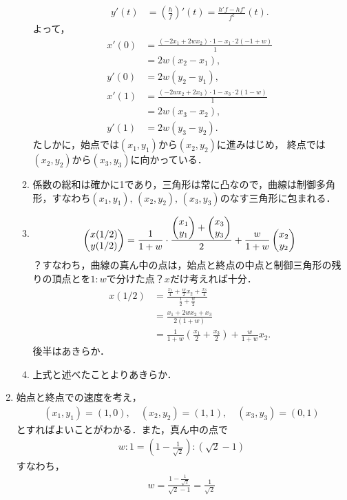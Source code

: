 \documentclass[9pt]{ltjsarticle}
\theoremstyle{break}
\theoremstyle{break}
\theoremstyle{break}
\theoremstyle{break}
\theoremstyle{break}
\theoremstyle{break}
\theoremstyle{break}
\theoremstyle{break}
\theoremstyle{break}
\theoremstyle{break}
\theoremstyle{break}
\theoremstyle{break}
\theoremstyle{break}
\theoremstyle{break}
\theoremstyle{break}
\theoremstyle{nonumberbreak}
\theoremstyle{nonumberbreak}
\begin{document}
\begin{enumerate}[label=(問題\arabic*)]
\begin{enumerate}[label=(\alph*)]
\begin{align}
 y'(t)& = (\frac{h}{f})'(t) = \frac{h'f - hf'}{f^2}(t).
\end{align}
よって，
\begin{align}
 x'(0) &= \frac{(-2x_1 + 2wx_2)\cdot 1 - x_1\cdot 2(-1+w)}{1}\\
&=
2w(x_2-x_1),\\
 y'(0)& =2w(y_2-y_1),\\
 x'(1)& =\frac{(-2wx_2+2x_3)\cdot 1 - x_3\cdot 2(1-w)}{1}\\
 & =
2w(x_3-x_2),\\
 y'(1)& = 2w(y_3-y_2).
\end{align}
たしかに，始点では$(x_1,y_1)$から$(x_2,y_2)$に進みはじめ，
終点では$(x_2,y_2)$から$(x_3,y_3)$に向かっている．
 \item 係数の総和は確かに1であり，三角形は常に凸なので，曲線は制御多角形，すなわち$(x_1,y_1),\, (x_2,y_2),\, (x_3,y_3)$のなす三角形に包まれる．
 \item
\begin{align}
 \left(\begin{matrix} x(1/2) \\ y(1/2) \end{matrix}\right) =
\frac{1}{1+w}\cdot \frac{\left(\begin{matrix} x_1 \\ y_1 \end{matrix}\right) + \left(\begin{matrix} x_3 \\ y_3 \end{matrix}\right)}{2}
+
\frac{w}{1+w}\left(\begin{matrix} x_2 \\ y_2 \end{matrix}\right)
\end{align}
？すなわち，曲線の真ん中の点は，始点と終点の中点と制御三角形の残りの頂点とを$1:w$で分けた点？$x$だけ考えれば十分．
\begin{align}
 x(1/2)
&=
\frac{\frac{x_1}{4} + \frac{w}{2}x_2 + \frac{x_3}{4}}{\frac{1}{2}+\frac{w}{2}}\\
 & =
\frac{x_1 + 2wx_2 + x_3}{2(1+w)}\\
 & =
\frac{1}{1+w}(\frac{x_1}{2} + \frac{x_3}{2}) + \frac{w}{1+w}x_2.
\end{align}
後半はあきらか．
 \item 上式と述べたことよりあきらか．
\end{enumerate}
 \item 始点と終点での速度を考え，
\begin{align}
 (x_1,y_1) = (1,0),\quad (x_2,y_2) = (1,1),\quad (x_3,y_3)= (0,1)
\end{align}
とすればよいことがわかる．また，真ん中の点で
\begin{align}
 w:1  = (1-\frac{1}{\sqrt{2}}):(\sqrt{2}-1)
\end{align}
すなわち，
\begin{align}
 w= \frac{1-\frac{1}{\sqrt{2}}}{\sqrt{2}-1}
=\frac{1}{\sqrt{2}}
\end{align}

\end{enumerate}
\end{document}
